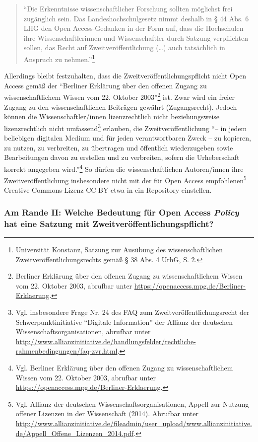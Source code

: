 \documentclass[a4paper,
fontsize=11pt,
oneside,
numbers=noperiodatend,
parskip=half-,
bibliography=totoc,
final
]{scrartcl}
\begin{document}
\begin{quote}
\enquote{Die Erkenntnisse wissenschaftlicher Forschung sollten möglichst
frei zugänglich sein. Das Landeshochschulgesetz nimmt deshalb in § 44
Abs. 6 LHG den Open Access-Gedanken in der Form auf, dass die
Hochschulen ihre Wissenschaftlerinnen und Wissenschaftler durch Satzung
verpflichten sollen, das Recht auf Zweitveröffentlichung (\ldots{}) auch
tatsächlich in Anspruch zu nehmen.}\footnote{Universität Konstanz,
  Satzung zur Ausübung des wissenschaftlichen
  Zweit\-ver\-öffent\-lich\-ungs\-rechts gemäß § 38 Abs. 4 UrhG, S. 2.}
\end{quote}

Allerdings bleibt festzuhalten, dass die Zweit\-ver\-öffent\-lich\-ungs\-pflicht
nicht Open Access gemäß der \enquote{Berliner Erklärung über den offenen
Zugang zu wissenschaftlichem Wissen vom 22. Oktober 2003}\footnote{Berliner
  Erklärung über den offenen Zugang zu wissenschaftlichem Wissen vom 22.
  Oktober 2003, abrufbar unter
  \url{https://openaccess.mpg.de/Berliner-Erklaerung}.} ist. Zwar wird
ein freier Zugang zu den wissenschaftlichen Beiträgen gewährt
(Zugangsrecht). Jedoch können die Wissenschaftler/innen lizenzrechtlich
nicht beziehungsweise lizenzrechtlich nicht umfassend\footnote{Vgl.
  insbesondere Frage Nr. 24 des FAQ zum Zweit\-ver\-öffent\-lich\-ungs\-recht der
  Schwerpunktinitiative \enquote{Digitale Information} der Allianz der
  deutschen Wissenschaftsorganisationen, abrufbar unter
  \url{http://www.allianzinitiative.de/handlungsfelder/rechtliche-rahmenbedingungen/faq-zvr.html}.}
erlauben, die Zweitveröffentlichung \enquote{-- in jedem beliebigen
digitalen Medium und für jeden verantwortbaren Zweck -- zu kopieren, zu
nutzen, zu verbreiten, zu übertragen und öffentlich wiederzugeben sowie
Bearbeitungen davon zu erstellen und zu verbreiten, sofern die
Urheberschaft korrekt angegeben wird.}\footnote{Vgl. Berliner Erklärung
  über den offenen Zugang zu wissenschaftlichem Wissen vom 22. Oktober
  2003, abrufbar unter
  \url{https://openaccess.mpg.de/Berliner-Erklaerung}.} So dürfen die
wissenschaftlichen Autoren/innen ihre Zweitveröffentlichung insbesondere
nicht mit der für Open Access empfohlenen\footnote{Vgl. Allianz der
  deutschen Wissenschaftsorganisationen, Appell zur Nutzung offener
  Lizenzen in der Wissenschaft (2014). Abrufbar unter
  \url{http://www.allianzinitiative.de/fileadmin/user_upload/www.allianzinitiative.de/Appell_Offene_Lizenzen_2014.pdf}.}
Creative Commons-Lizenz CC BY etwa in ein Repository einstellen.

\hypertarget{am-rande-ii-welche-bedeutung-fuxfcr-open-access-policy-hat-eine-satzung-mit-zweitveruxf6ffentlichungspflicht}{%
\subsubsection{\texorpdfstring{Am Rande II: Welche Bedeutung für Open
Access \emph{Policy} hat eine Satzung mit
Zweit\-ver\-öffent\-lich\-ungs\-pflicht?}{Am Rande II: Welche Bedeutung für Open Access Policy hat eine Satzung mit Zweit\-ver\-öffent\-lich\-ungs\-pflicht?}}\label{am-rande-ii-welche-bedeutung-fuxfcr-open-access-policy-hat-eine-satzung-mit-zweitveruxf6ffentlichungspflicht}}
\end{document}
